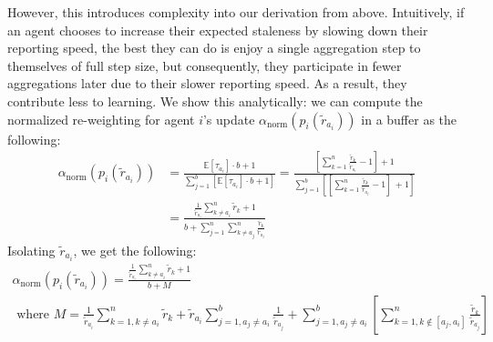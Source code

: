 \documentclass{article}
\begin{document}
However, this introduces complexity into our derivation from above. Intuitively, if an agent chooses to increase their expected staleness by slowing down their reporting speed, the best they can do is enjoy a single aggregation step to themselves of full step size, but consequently, they participate in fewer aggregations later due to their slower reporting speed. As a result, they contribute less to learning. We show this analytically: we can compute the normalized re-weighting for agent $i$'s update $\alpha_{\text{norm}}(p_i(\tilde{r}_{a_i}))$ in a buffer as the following:
\begin{align*}
\alpha_{\text{norm}}(p_i(\tilde{r}_{a_i})) 
    &=
    \frac{\mathbb{E}[\tau_{a_i}] \cdot b + 1}{\sum_{j=1}^b{\left[
    \mathbb{E}[\tau_{a_i}] \cdot b + 1
    \right]}} 
    = \frac{
        \left[\sum_{k=1}^n{
        \frac{\tilde{r}_k}{\tilde{r}_{a_i}} - 1
        }\right] + 1
    }{\sum_{j=1}^b{\left[
        \left[\sum_{k=1}^n{
        \frac{\tilde{r}_k}{\tilde{r}_{a_j}} - 1
        }\right] \
    + 1\right]}} \\
    &= \frac{
    \frac{1}{\tilde{r}_{a_i}}\sum_{k\neq a_i}^n{\tilde{r}_k} + 1
    }{
    b + \sum_{j=1}^n{\sum_{k\neq a_j}^n{\frac{\tilde{r}_k}{\tilde{r}_{a_j}}}}
    } 
\end{align*}
Isolating $\tilde{r}_{a_i}$, we get the following:
\begin{gather*}
    \alpha_{\text{norm}}(p_i(\tilde{r}_{a_i})) 
    =
    \frac{
    \frac{1}{\tilde{r}_{a_i}}\sum_{k\neq a_i}^n{\tilde{r}_k} + 1
    }{
    b + M
    }
    \\
    \text{ where } 
    M = \frac{1}{\tilde{r}_{a_i}}\sum_{k=1, k\neq a_i}^n {\tilde{r}_k} + \tilde{r}_{a_i} \sum_{j=1, a_j \neq a_i} ^ b {\frac{1}{\tilde{r}_{a_j}}} + \sum_{j=1, a_j \neq a_i}^b{
        \left[\sum_{k=1, k \notin [a_j, a_i]}^n {\frac{\tilde{r}_k}{\tilde{r}_{a_j}}}
        \right]
    }
\end{gather*}
\end{document}
